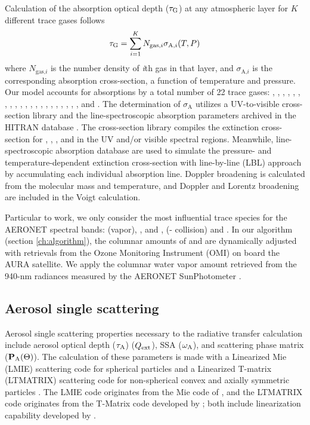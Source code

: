 Calculation of the absorption optical depth ($\tau_\text{G}$) at
any atmospheric layer for $K$ different trace gases follows
\begin{equation}
\tau_\text{G} = \sum_{i=1}^K N_{\text{gas,}i}\sigma_{\text{A,}i}(T,P) 
\end{equation}
where $N_{\text{gas,}i}$ is the number density of \textit{i}th gas
in that layer, and $\sigma_{\text{A,}i}$ is the corresponding
absorption cross-section, a function of temperature and pressure. 
Our model accounts for absorptions by a total number of
22 trace gases: , , , , ,
, , , , , , ,
, , , , , , ,
, , and .
The determination of $\sigma_\text{A}$  
utilizes a UV-to-visible cross-section library and the line-spectroscopic
absorption parameters archived in the HITRAN database \citep{Orphal03,
Rothman09}. The cross-section library compiles the extinction
cross-section for , , , and  in the UV
and/or visible spectral regions. Meanwhile, line-spectroscopic 
absorption database are used to simulate the pressure- and
temperature-dependent extinction cross-section with line-by-line (LBL) 
approach \citep{Liou02,Rothman09} by accumulating each individual 
absorption line. Doppler broadening is calculated from the molecular mass
and temperature, and Doppler and Lorentz broadening are included in the
Voigt calculation.

Particular to work, we only consider the most influential 
trace species for the AERONET spectral bands:  (vapor), , 
and ,  (- collision) and . 
In our algorithm (section \ref{ch:algorithm}), the columnar
amounts of  and  are dynamically adjusted with retrievals from the
Ozone Monitoring Instrument (OMI) \citep{Levelt06} on board the
AURA satellite. We apply the columnar water vapor amount retrieved from
the 940-nm radiances measured by the AERONET SunPhotometer
\citep{Halthore97}.

\subsection{Aerosol single scattering} \label{subsec:mie}

Aerosol single scattering properties necessary to the radiative
transfer calculation include aerosol optical depth ($\tau_\text{A}$)
($Q_\text{ext}$), SSA ($\omega_\text{A}$), and scattering phase matrix ($\mathbf{P}_\text{A}(\Theta)$).
The calculation of these parameters is made with a Linearized Mie (LMIE)
scattering code for spherical particles and a Linearized
T-matrix (LTMATRIX) scattering code for non-spherical convex and axially
symmetric particles \citep{Spurr12}. The LMIE code originates from the Mie code
of \citet{deRooij84}, and the LTMATRIX code originates from the T-Matrix
code developed by \citet{Mishchenko96, Mishchenko98}; both include
linearization capability developed by \citet{Spurr12}.

